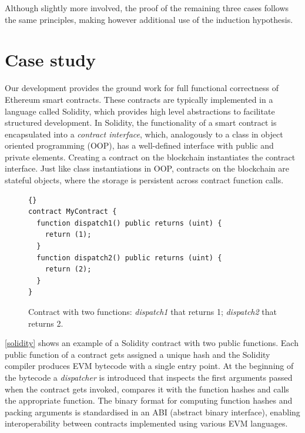 \documentclass[sigplan,10pt,review]{acmart}\settopmatter{printfolios=true,printccs=false,printacmref=false}
\begin{document}
Although slightly more involved, the proof of the remaining three cases follows the
same principles,
making however additional use of the induction hypothesis.
%
\section{Case study}
\label{sec:case}



Our development provides the ground work for full functional correctness
of Ethereum smart contracts.
These contracts are typically implemented in a language called Solidity,
which provides high level abstractions to facilitate 
structured development.
In Solidity, the functionality of a smart contract is encapsulated into a
\textit{contract interface}, which, analogously to a class in object oriented programming
(OOP), has a well-defined interface with public and private elements.
Creating a contract on the blockchain instantiates the contract interface.
Just like class instantiations in OOP, contracts on the blockchain are
stateful objects, where the storage is persistent across contract function calls.

\begin{figure}[h!]
\begin{lstlisting}[language=Solidity]{}
contract MyContract {
  function dispatch1() public returns (uint) {
  	return (1);
  }
  function dispatch2() public returns (uint) {
  	return (2);
  }
}
\end{lstlisting}
\caption{Contract with two functions: \textit{dispatch1} that returns 1; \textit{dispatch2} that returns 2.}
\label{solidity}
\end{figure}

\autoref{solidity} shows an example of a Solidity contract with two public functions.
Each public function of a contract gets assigned a unique hash and
the Solidity compiler produces EVM bytecode with a single entry point.
At the beginning of the bytecode a \textit{dispatcher} is introduced that inspects the first arguments
passed when the contract gets invoked, compares it with the function hashes and
calls the appropriate function.
The binary format for computing function hashes and packing arguments is standardised
in an ABI (abstract binary interface), enabling interoperability between
contracts implemented using various EVM languages.
\end{document}
